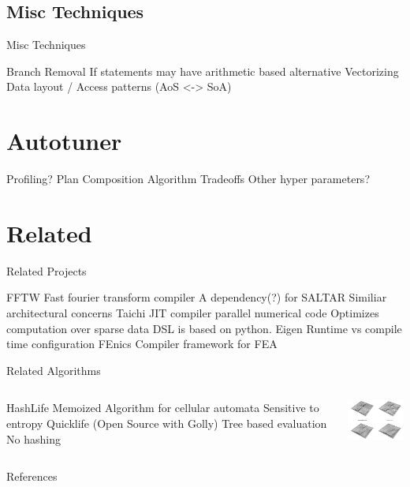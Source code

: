 \documentclass{beamer}
\begin{document}
\subsection{Misc Techniques}
\begin{frame}{Misc Techniques}
\begin{outline}
  \1 Branch Removal
    \2 If statements may have arithmetic based alternative
  \1 Vectorizing
  \1 Data layout / Access patterns (AoS <-> SoA)
\end{outline}
\end{frame}

\section{Autotuner}
\begin{frame}
\begin{outline}
  \1 Profiling?
  \1 Plan Composition
  \1 Algorithm Tradeoffs
  \1 Other hyper parameters?
\end{outline}
\end{frame}

\section{Related}

\begin{frame}{Related Projects}
\begin{outline}

  \1 FFTW  \cite{Frigo2005}
    \2 Fast fourier transform compiler
    \2 A dependency(?) for SALTAR
    \2 Similiar architectural concerns
  \1 Taichi \cite{Hu2019}
    \2 JIT compiler parallel numerical code
    \2 Optimizes computation over sparse data
    \2 DSL is based on python.
  \1 Eigen \cite{eigenweb}
    \2 Runtime vs compile time configuration
  \1 FEnics \cite{Barrata2023} 
    \2 Compiler framework for FEA
\end{outline}
\end{frame}

\begin{frame}{Related Algorithms}
\begin{columns}
\centering
\begin{outline}
  \1 HashLife \cite{Gosper1984}
    \2 Memoized Algorithm for cellular automata
    \2 Sensitive to entropy
  \1 Quicklife (Open Source with Golly)
    \2 Tree based evaluation
    \2 No hashing
\end{outline}
\centering
\includegraphics[width=4cm]{../../assets/hashlife_figure.png}
\end{columns}
\end{frame}


\begin{frame}[allowframebreaks]{References}
    \tiny
    \printbibliography
\end{frame}
\end{document}
